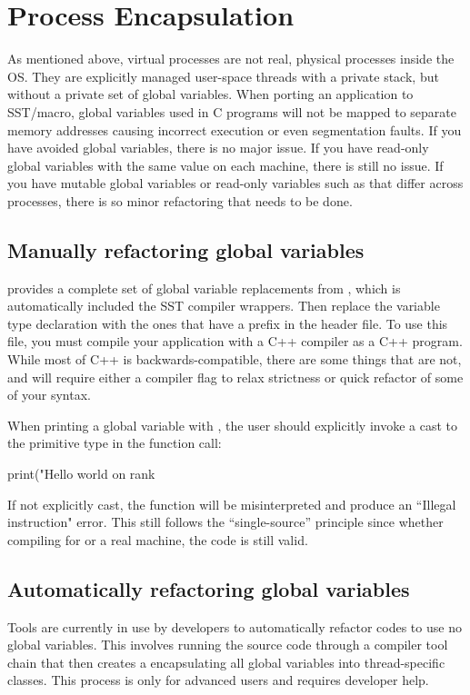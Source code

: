 \section{Process Encapsulation}

As mentioned above, virtual processes are not real, physical processes inside the OS.
They are explicitly managed user-space threads with a private stack, but without a private set of global variables.
When porting an application to SST/macro, global variables used in C programs will not be mapped to separate memory addresses causing incorrect execution or even segmentation faults.
If you have avoided global variables, there is no major issue.  
If you have read-only global variables with the same value on each machine, there is still no issue.
If you have mutable global variables or read-only variables such as  that differ across processes,
there is so minor refactoring that needs to be done.

\subsection{Manually refactoring global variables}
\label{sec:skel:globals}
\sstmacro provides a complete set of global variable replacements from 
, which is automatically included the SST compiler wrappers.
Then replace the variable type declaration with the ones that have a  prefix in the header file.
To use this file, you must compile your application with a C++ compiler as a C++ program.  While most of C++ is backwards-compatible, there are some things that are not, and will require either a compiler flag to relax strictness or quick refactor of some of your syntax.

When printing a global variable with , the user should explicitly invoke a cast to the primitive type in the function call:

\begin{CppCode}
print("Hello world on rank %
\end{CppCode}
If not explicitly cast, the  function will be misinterpreted and produce an ``Illegal instruction" error.  
This still follows the ``single-source'' principle since whether compiling for \sstmacro or a real machine, the code is still valid.

\subsection{Automatically refactoring global variables}
Tools are currently in use by developers to automatically refactor codes to use no global variables.
This involves running the source code through a compiler tool chain that then creates a 
encapsulating all global variables into thread-specific classes.
This process is only for advanced users and requires developer help.

